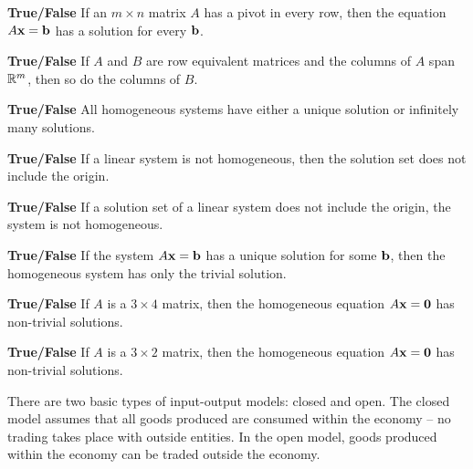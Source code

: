 \item \textbf{True/False} If an $m \times n$ matrix $A$ has a pivot in every row, then the equation $A\mathbf{x}=\mathbf{b}$ has a solution for every $\mathbf{b}$.

\item \textbf{True/False} If $A$ and $B$ are row equivalent matrices and the columns of $A$ span $\mathbb{R}^m$, then so do the columns of $B$.

\item \textbf{True/False} All homogeneous systems have either a unique solution or infinitely many solutions.

\item \textbf{True/False} If a linear system is not homogeneous, then the solution set does not include the origin.

\item \textbf{True/False} If a solution set of a linear system does not include the origin, the system is not homogeneous.

\item \textbf{True/False} If the system $A\mathbf{x}=\mathbf{b}$ has a unique solution for some $\mathbf{b}$, then the homogeneous system has only the trivial solution.

\item \textbf{True/False} If $A$ is a $3\times 4$ matrix, then the homogeneous equation $A\mathbf{x}=\mathbf{0}$ has non-trivial solutions.

\item \textbf{True/False}  If $A$ is a $3\times 2$ matrix, then the homogeneous equation $A\mathbf{x}=\mathbf{0}$ has non-trivial solutions.

\ea
\ee


There are two basic types of input-output models: closed and open. The closed model assumes that all goods produced are consumed within the economy -- no trading takes place with outside entities. In the open model, goods produced within the economy can be traded outside the economy.

